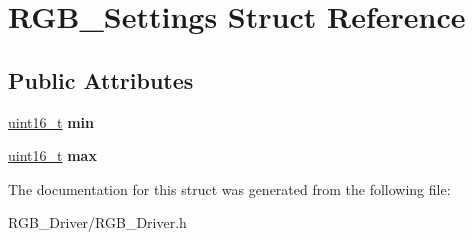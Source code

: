 \hypertarget{structRGB__Settings}{}\section{R\+G\+B\+\_\+\+Settings Struct Reference}
\label{structRGB__Settings}
\subsection*{Public Attributes}
\begin{DoxyCompactItemize}
\item 
\mbox{\label{structRGB__Settings_a9e18e6d4e846862f2521373aaf03a6e3}} 
\hyperlink{vl53l0x__types_8h_a273cf69d639a59973b6019625df33e30}{uint16\+\_\+t} {\bfseries min}
\item 
\mbox{\label{structRGB__Settings_a7a4ce1515d50deb10e319cdf1ed4e67b}} 
\hyperlink{vl53l0x__types_8h_a273cf69d639a59973b6019625df33e30}{uint16\+\_\+t} {\bfseries max}
\end{DoxyCompactItemize}


The documentation for this struct was generated from the following file\+:\begin{DoxyCompactItemize}
\item 
R\+G\+B\+\_\+\+Driver/R\+G\+B\+\_\+\+Driver.\+h\end{DoxyCompactItemize}
